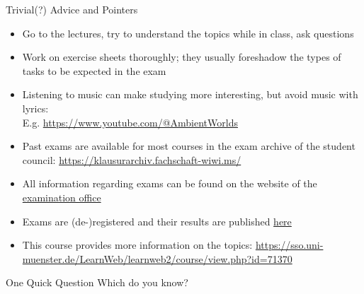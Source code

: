 \documentclass{ercisbeamer}
\begin{document}
\begin{frame}{Trivial(?) Advice and Pointers}
    \begin{itemize}
        \item Go to the lectures, try to understand the topics while in class, ask questions
        \item Work on exercise sheets thoroughly; they usually foreshadow the types of tasks to be expected in the exam
        \item Listening to music can make studying more interesting, but avoid music with lyrics: \\ E.g. \url{https://www.youtube.com/@AmbientWorlds}
        \item Past exams are available for most courses in the exam archive of the student council: \url{https://klausurarchiv.fachschaft-wiwi.ms/}
        \item All information regarding exams can be found on the website of the \href{https://www.wiwi.uni-muenster.de/pam/en/examinations/schedule-examination-offer-examination-rooms}{examination office}
        \item Exams are (de-)registered and their results are published \href{https://pam-portal.uni-muenster.de/}{here}
        \item This course  provides more information on the topics: \url{https://sso.uni-muenster.de/LearnWeb/learnweb2/course/view.php?id=71370}
    \end{itemize}
\end{frame}

\begin{frame}{One Quick Question}
    \centering Which  do you know?
\end{frame}
\end{document}
